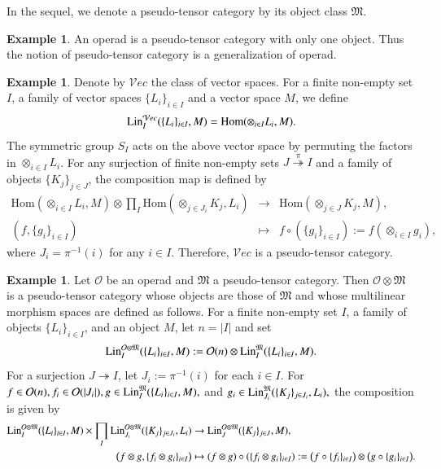 \documentclass[12pt]{amsart}
\theoremstyle{definition}
\newtheorem{ex}[thm]{Example}
\newcommand{\huaV}{\mathcal{V}}
\newcommand{\frkM}{\mathfrak M}
\newcommand{\Hom}{\mathrm{Hom}}
\newcommand{\ot}{\otimes}
\newcommand{\lin}{{\rm Lin}}
\newcommand{\cc}{\circ}
\begin{document}
In the sequel, we denote a pseudo-tensor category by its object class $\frkM$.

\begin{ex}
An operad is a pseudo-tensor category with only one object. Thus the notion of pseudo-tensor category is a generalization of operad.
\end{ex}
 

\begin{ex}\label{ps-cat-vec}
Denote by $\huaV ec$ the class of vector spaces. For a finite non-empty set $I$, a family of vector spaces $\{L_i\}_{i \in I}$ and a vector space $M$, we define $$
\lin_I^{\huaV ec}(\{L_i\}_{i \in I},M)=\Hom(\otimes_{i \in I} L_i, M).
$$
The symmetric group $S_I$ acts on the above vector space by permuting the factors in $\otimes_{i \in I} L_i$.
For any surjection of finite non-empty sets $J \overset{\pi}\twoheadrightarrow I$ and a family of objects $\{K_j\}_{j \in J}$, the composition map is defined by
\begin{eqnarray}
\Hom(\otimes_{i \in I}L_i,M)\otimes \prod_{I} \Hom(\otimes_{j \in J_i}{K_j},L_i) &\to& \Hom(\otimes_{j \in J}{K_j},M),\\
(f,\{g_i\}_{i \in I}) &\mapsto&f\cc(\{g_i\}_{i \in I}):=f (\otimes_{i \in I} g_i),\nonumber
\end{eqnarray}
where $J_i = \pi^{-1}(i)$ for any $i \in I$. Therefore, $\huaV ec$ is a pseudo-tensor category.
\end{ex}


 

\begin{ex}\label{operad-ot-pscategory}
	Let $\mathcal{O}$ be an operad and $\frkM$ a pseudo-tensor category.
Then $\mathcal{O}\otimes\frkM$ is a pseudo-tensor category
	whose objects are those of $\frkM$ and whose multilinear morphism spaces
	are defined as follows. For a finite non-empty set $I$, a family of objects
	$\{L_i\}_{i\in I}$, and an object $M$, let $n=|I|$ and set
	$$
	\lin_{I}^{\mathcal{O}\otimes\frkM}
	(\{L_i\}_{i\in I},M)
	:=
	\mathcal{O}(n)\otimes
	\lin_{I}^{\frkM}(\{L_i\}_{i\in I},M).
	$$
For a surjection $J\twoheadrightarrow I$, let
	$J_i:=\pi^{-1}(i)$ for each $i\in I$. For $f\in\mathcal{O}(n),
	f_i\in\mathcal{O}(|J_i|),
	g\in\lin_{I}^{\frkM}(\{L_i\}_{i\in I},M),$ and $g_i\in
	\lin_{J_i}^{\frkM}(\{K_j\}_{j\in J_i},L_i),
	$
	 the composition is given by
\begin{align*}
	\lin_{I}^{\mathcal{O}\ot \frkM}(\{L_i\}_{i\in I},M)\times \prod_{I}\lin_{J_i}^{\mathcal{O}\ot \frkM}(\{K_j\}_{j \in {J_i}},L_i) &\to \lin_J^{\mathcal{O}\ot \frkM}(\{K_j\}_{j \in J},M),\nonumber\\
	\big(f\ot g, \{f_i\ot g_i\}_{i\in I}\big) &\mapsto (f\ot g)\circ (\{f_i\ot g_i\}_{i\in I}) := \bigl(f\circ\{f_i\}_{i\in I}\bigr) \otimes \bigl(g\circ \{g_i\}_{i\in I}\bigr).
\end{align*}
\end{ex}
\end{document}
